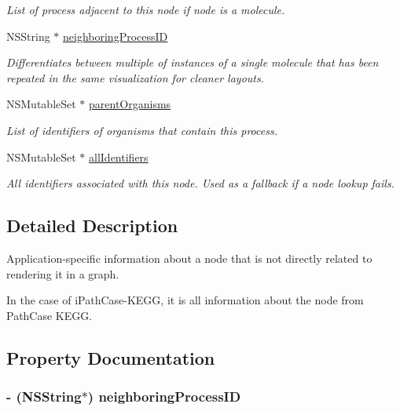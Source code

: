 \begin{DoxyCompactItemize}
\begin{DoxyCompactList}\small\item\em List of process adjacent to this node if node is a molecule. \end{DoxyCompactList}\item 
NSString $\ast$ \hyperlink{interface_p_c_node_info_a9d90a9d722f2621c15858b10115e99a3}{neighboringProcessID}
\begin{DoxyCompactList}\small\item\em Differentiates between multiple of instances of a single molecule that has been repeated in the same visualization for cleaner layouts. \end{DoxyCompactList}\item 
\hypertarget{interface_p_c_node_info_ac670aa13f2ea99c63ca59b52a3b81148}{
NSMutableSet $\ast$ \hyperlink{interface_p_c_node_info_ac670aa13f2ea99c63ca59b52a3b81148}{parentOrganisms}}
\label{interface_p_c_node_info_ac670aa13f2ea99c63ca59b52a3b81148}

\begin{DoxyCompactList}\small\item\em List of identifiers of organisms that contain this process. \end{DoxyCompactList}\item 
\hypertarget{interface_p_c_node_info_aa178311f14043d00b5ea922f937ef9c2}{
NSMutableSet $\ast$ \hyperlink{interface_p_c_node_info_aa178311f14043d00b5ea922f937ef9c2}{allIdentifiers}}
\label{interface_p_c_node_info_aa178311f14043d00b5ea922f937ef9c2}

\begin{DoxyCompactList}\small\item\em All identifiers associated with this node. Used as a fallback if a node lookup fails. \end{DoxyCompactList}\end{DoxyCompactItemize}


\subsection{Detailed Description}
Application-\/specific information about a node that is not directly related to rendering it in a graph. 

In the case of iPathCase-\/KEGG, it is all information about the node from PathCase KEGG. 

\subsection{Property Documentation}
\hypertarget{interface_p_c_node_info_a9d90a9d722f2621c15858b10115e99a3}{
\subsubsection[{neighboringProcessID}]{\setlength{\rightskip}{0pt plus 5cm}-\/ (NSString$\ast$) neighboringProcessID}}
\label{interface_p_c_node_info_a9d90a9d722f2621c15858b10115e99a3}


